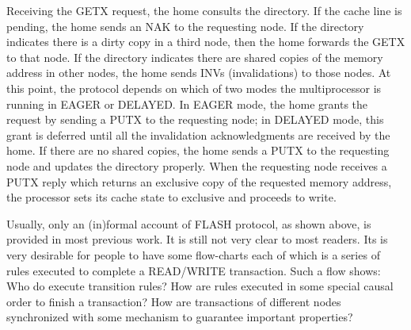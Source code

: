 \documentclass{llncs}
\newcommand{\bedt}[1]{{\color{blue}#1}}
\begin{document}
Receiving the GETX request, the home consults the directory. If the \bedt{cache} line is pending,
the home sends an NAK to the requesting node. If the directory indicates there is a dirty
copy in a third node, then the home forwards the GETX to that node. If the directory
indicates there are shared copies of the memory \bedt{address} in other nodes, the home sends
INVs (invalidations) to those nodes. At this point, the protocol depends on which of two
modes the multiprocessor is running in EAGER or DELAYED. In EAGER mode, the home
grants the request by sending a PUTX to the requesting node; in DELAYED mode, this
grant is deferred until all the invalidation acknowledgments are received by the home. If
there are no shared copies, the home sends a PUTX to the requesting node and updates
the directory properly. When the requesting node receives a PUTX reply which returns
an exclusive copy of the requested memory \bedt{address}, the processor sets its cache state to
exclusive and proceeds to write.


Usually, only an \bedt{(in)formal}  account of FLASH protocol, as shown above, is provided in most previous work.   It is still not very clear to most readers. %
Its is very desirable for people to have some flow-charts each of  which is a series of rules executed to complete a READ/WRITE transaction. Such a flow shows: Who do execute transition rules? How  are rules executed in some special causal order to finish a transaction? How are transactions of different nodes  synchronized with some mechanism to guarantee  important properties? %



\end{document}
